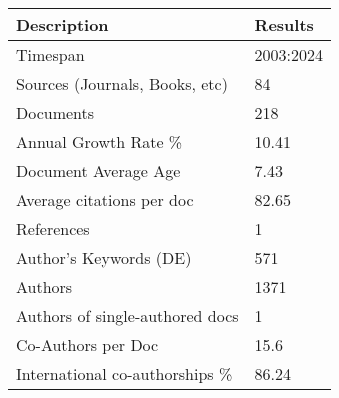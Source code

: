 
\begin{tabular}{ll}
\toprule
Description & Results\\
\midrule
Timespan & 2003:2024\\
Sources (Journals, Books, etc) & 84\\
Documents & 218\\
Annual Growth Rate \% & 10.41\\
Document Average Age & 7.43\\
\addlinespace
Average citations per doc & 82.65\\
References & 1\\
Author's Keywords (DE) & 571\\
Authors & 1371\\
Authors of single-authored docs & 1\\
\addlinespace
Co-Authors per Doc & 15.6\\
International co-authorships \% & 86.24\\
\bottomrule
\end{tabular}